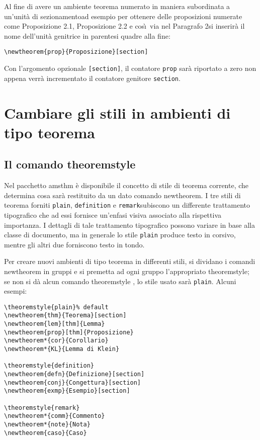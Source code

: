 \documentclass[a4paper]{article}
\providecommand{\mdash}{\textemdash\penalty\hyphenpenalty}
\newcommand{\ntt}{%
  \fontfamily\ttdefault \fontseries\mddefault \fontshape\updefault
  \selectfont
}
\DeclareRobustCommand{\cn}[1]{{\ntt\bslchar#1}}
\DeclareRobustCommand{\pkg}[1]{{\ntt#1}}
\begin{document}
Al fine di avere un ambiente teorema numerato in maniera subordinata a
un'unit\`a di sezionamento\mdash ad esempio per ottenere delle
proposizioni numerate come Proposizione 2.1,
Proposizione 2.2 e cos\`\i\ via nel Paragrafo 2\mdash si inserir\`a il nome
dell'unit\`a genitrice in parentesi quadre alla fine:
\begin{verbatim}
\newtheorem{prop}{Proposizione}[section]
\end{verbatim}
Con l'argomento opzionale \verb'[section]', il contatore \verb'prop'
sar\`a riportato a zero non appena verr\`a incrementato il contatore genitore \verb'section'.

\section{Cambiare gli stili in ambienti di tipo teorema}

\subsection{Il comando \cn{theoremstyle}}

Nel pacchetto \pkg{amsthm} \`e disponibile il concetto di stile di
teorema corrente,
che determina cosa sar\`a restituito da un dato comando \cn{newtheorem}.
I tre stili di teorema forniti\mdash
\verb'plain',\relax
{}\relax
{} \verb'definition' e
\verb'remark'\mdash subiscono un differente trattamento tipografico che
ad essi fornisce un'enfasi visiva associato alla rispettiva
importanza. I dettagli di tale trattamento tipografico possono variare
in base alla classe di documento, ma in generale lo stile \verb'plain'
produce testo in corsivo, mentre gli altri due forniscono testo in tondo.

Per creare nuovi ambienti di tipo teorema in differenti stili,
si dividano i comandi \cn{new\-theorem} in gruppi e si premetta ad ogni
gruppo l'appropriato \cn{theo\-rem\-style}; se non si d\`a alcun comando \cn{theoremstyle}
, lo stile usato sar\`a \texttt{plain}. Alcuni esempi:
\begin{verbatim}
\theoremstyle{plain}% default
\newtheorem{thm}{Teorema}[section]
\newtheorem{lem}[thm]{Lemma}
\newtheorem{prop}[thm]{Proposizione}
\newtheorem*{cor}{Corollario}
\newtheorem*{KL}{Lemma di Klein}

\theoremstyle{definition}
\newtheorem{defn}{Definizione}[section]
\newtheorem{conj}{Congettura}[section]
\newtheorem{exmp}{Esempio}[section]

\theoremstyle{remark}
\newtheorem*{comm}{Commento}
\newtheorem*{note}{Nota}
\newtheorem{caso}{Caso}
\end{verbatim}
\end{document}
